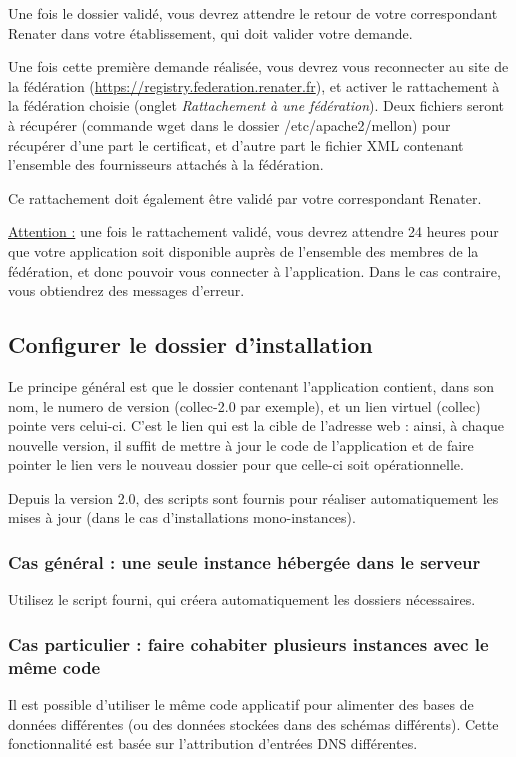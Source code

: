 Une fois le dossier validé, vous devrez attendre le retour de votre correspondant Renater dans votre établissement, qui doit valider votre demande.

Une fois cette première demande réalisée, vous devrez vous reconnecter au site de la fédération (\href{https://registry.federation.renater.fr}{https://registry.federation.renater.fr}), et activer le rattachement à la fédération choisie (onglet \textit{Rattachement à une fédération}). Deux fichiers seront à récupérer (commande wget dans le dossier /etc/apache2/mellon) pour récupérer d'une part le certificat, et d'autre part le fichier XML contenant l'ensemble des fournisseurs attachés à la fédération.

Ce rattachement doit également être validé par votre correspondant Renater.

\underline{Attention :} une fois le rattachement validé, vous devrez attendre 24 heures pour que votre application soit disponible auprès de l'ensemble des membres de la fédération, et donc pouvoir vous connecter à l'application. Dans le cas contraire, vous obtiendrez des messages d'erreur.
 

\subsection{Configurer le dossier d'installation}

Le principe général est que le dossier contenant l'application contient, dans son nom, le numero de version (collec-2.0 par exemple), et un lien virtuel (collec) pointe vers celui-ci. C'est le lien qui est la cible de l'adresse web : ainsi, à chaque nouvelle version, il suffit de mettre à jour le code de l'application et de faire pointer le lien vers le nouveau dossier pour que celle-ci soit opérationnelle.

Depuis la version 2.0, des scripts sont fournis pour réaliser automatiquement les mises à jour (dans le cas d'installations mono-instances).

\subsubsection{Cas général : une seule instance hébergée dans le serveur}

Utilisez le script fourni, qui créera automatiquement les dossiers nécessaires. 


\subsubsection{Cas particulier : faire cohabiter plusieurs instances avec le même code}
\label{dnsmultiple}
Il est possible d'utiliser le même code applicatif pour alimenter des bases de données différentes (ou des données stockées dans des schémas différents). Cette fonctionnalité est basée sur l'attribution d'entrées DNS différentes. 

